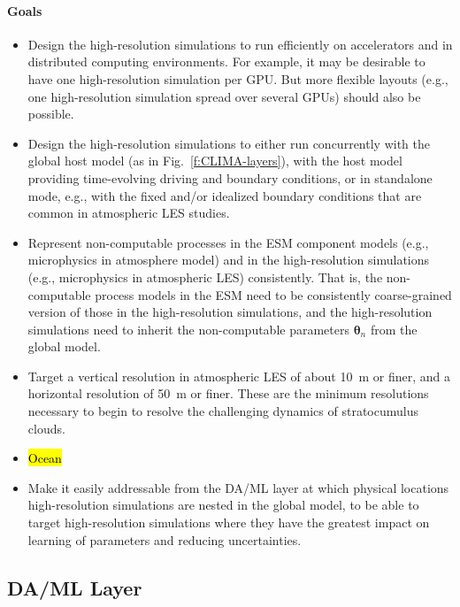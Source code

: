 \documentclass{article}
\renewcommand{\vec}[1]{\boldsymbol{{#1}}}
\begin{document}
\paragraph{Goals}
\begin{itemize}
    \item Design the high-resolution simulations to run efficiently on accelerators and in distributed computing environments.  For example, it may be desirable to have one high-resolution simulation per GPU. But more flexible layouts (e.g., one high-resolution simulation spread over several GPUs) should also be possible.
    \item Design the high-resolution simulations to either run concurrently with the global host model (as in Fig.~\ref{f:CLIMA-layers}), with the host model providing time-evolving driving and boundary conditions, or in standalone mode, e.g., with the fixed and/or idealized boundary conditions that are common in atmospheric LES studies. 
    \item Represent non-computable processes in the ESM component models (e.g., microphysics in atmosphere model) and in the high-resolution simulations (e.g., microphysics in atmospheric LES) consistently. That is, the non-computable process models in the ESM need to be consistently coarse-grained version of those in the high-resolution simulations, and the high-resolution simulations need to inherit the non-computable parameters $\vec{\theta}_n$ from the global model.
    \item Target a vertical resolution in atmospheric LES of about 10~m or finer, and a horizontal resolution of 50~m or finer. These are the minimum resolutions necessary to begin to resolve the challenging dynamics of stratocumulus clouds. 
    \item \hl{Ocean}
    \item Make it easily addressable from the DA/ML layer at which physical locations high-resolution simulations are nested in the global model, to be able to target high-resolution simulations where they have the greatest impact on learning of parameters and reducing uncertainties. 
\end{itemize}



\subsection{DA/ML Layer}
\end{document}
